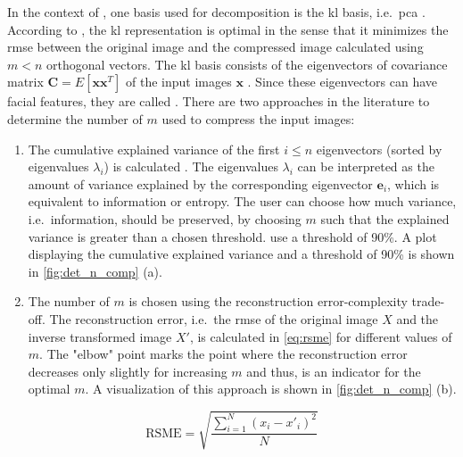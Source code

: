 In the context of \eigenfaces{}, one basis used for decomposition is the \ac{kl} basis, i.e.\ \ac{pca} \cite{eigenfaces1997, eigenfaces1991}.
According to \citeauthor{eigenfaces1997}, the \ac{kl} representation is optimal in the sense that it minimizes the \ac{rmse} between the original image and 
the compressed image calculated using $m < n$ orthogonal vectors.
The \ac{kl} basis consists of the eigenvectors of covariance matrix $\textbf{C} = E\left[ \textbf{x}\textbf{x}^{T} \right]$ of the input images $\mathbf{x}$ \cite{eigenfaces1997}.
Since these eigenvectors can have facial features, they are called \textit{\eigenfaces{}}.
There are two approaches in the literature to determine the number of \eigenfaces{} $m$ used to compress the input images:
\begin{enumerate}[label=(\alph*)]
    \item The cumulative explained variance of the first $i \le n$ eigenvectors (sorted by eigenvalues $\lambda_i$) is calculated 
        \cite{eigenfaces1997, face-recognition2020, face-recognition2021}.
        The eigenvalues $\lambda_i$ can be interpreted as the amount of variance explained by the corresponding eigenvector $\textbf{e}_i$, which is equivalent to information or entropy.
        The user can choose how much variance, i.e.\ information, should be preserved, by choosing $m$ such that the explained variance is greater than a chosen threshold.
        \citeauthor{face-recognition2021} use a threshold of 90\%.
        A plot displaying the cumulative explained variance and a threshold of 90\% is shown in \autoref{fig:det_n_comp} (a).

    \item The number of \eigenfaces{} $m$ is chosen using the reconstruction error-complexity trade-off. %
        The reconstruction error, i.e.\ the \ac{rmse} of the original image $X$ and the inverse transformed image $X'$, is 
        calculated in \autoref{eq:rsme} for different values of $m$.
        The "elbow" point marks the point where the reconstruction error decreases only slightly for increasing $m$ and thus, is an indicator for the optimal $m$.
        A visualization of this approach is shown in \autoref{fig:det_n_comp} (b).
\end{enumerate}

\begin{equation}
    \text{RSME} = \sqrt{\frac{\sum_{i=1}^{N}(x_{i}-x'_i)^2}{N}}
    \label{eq:rsme}
\end{equation}
 
